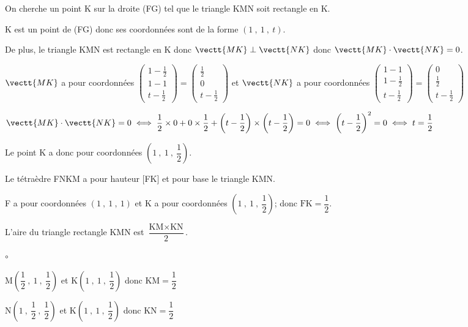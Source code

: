 \begin{enumerate}
On cherche un point K sur la droite (FG) tel que le triangle KMN soit rectangle en K.

K est un point de (FG) donc ses coordonnées sont de la forme $\left (1~,~1~,~t\right )$.

De plus, le triangle KMN est rectangle en K donc $\vectt{MK}\perp\vectt{NK}$ donc $\vectt{MK}\cdot\vectt{NK}=0$.

$\vectt{MK}$ a pour coordonnées
$\begin{pmatrix}
1-\frac{1}{2}\\1-1\\t-\frac{1}{2}
\end{pmatrix}
=
\begin{pmatrix}
\frac{1}{2}\\0\\t-\frac{1}{2}
\end{pmatrix}$
et
$\vectt{NK}$ a pour coordonnées
$\begin{pmatrix}
1-1\\1-\frac{1}{2}\\t-\frac{1}{2}
\end{pmatrix}
=
\begin{pmatrix}
0\\\frac{1}{2}\\t-\frac{1}{2}
\end{pmatrix}$

$\vectt{MK}\cdot\vectt{NK}=0
\iff \dfrac{1}{2}\times 0 + 0\times \dfrac{1}{2} + \left (t-\dfrac{1}{2}\right )\times \left (t-\dfrac{1}{2}\right ) = 0
\iff \left (t-\dfrac{1}{2}\right )^2=0
\iff t=\dfrac{1}{2}$

Le point K a donc pour coordonnées $\left (1~,~1~,~\dfrac{1}{2} \right )$.

\item %
Le tétraèdre FNKM a pour hauteur [FK] et pour base le triangle KMN.

\begin{list}{\textbullet}{}
\item F a pour coordonnées $\left (1~,~1~,~1\right )$ et K a pour coordonnées $\left (1~,~1~,~\dfrac{1}{2} \right )$; donc $\text{FK}=\dfrac{1}{2}$.

\item L'aire du triangle rectangle KMN est $\dfrac{\text{KM}\times\text{KN}}{2}$.

\begin{list}{$\circ$}{}
\item M\;$\left (\dfrac{1}{2}~,~1~,~\dfrac{1}{2} \right )$ et K\;$\left (1~,~1~,~\dfrac{1}{2} \right )$ donc $\text{KM}=\dfrac{1}{2}$
\item N\;$\left (1~,~\dfrac{1}{2}~,~\dfrac{1}{2} \right )$ et K\;$\left (1~,~1~,~\dfrac{1}{2} \right )$ donc $\text{KN}=\dfrac{1}{2}$
\end{list}


\end{list}
\end{enumerate}
